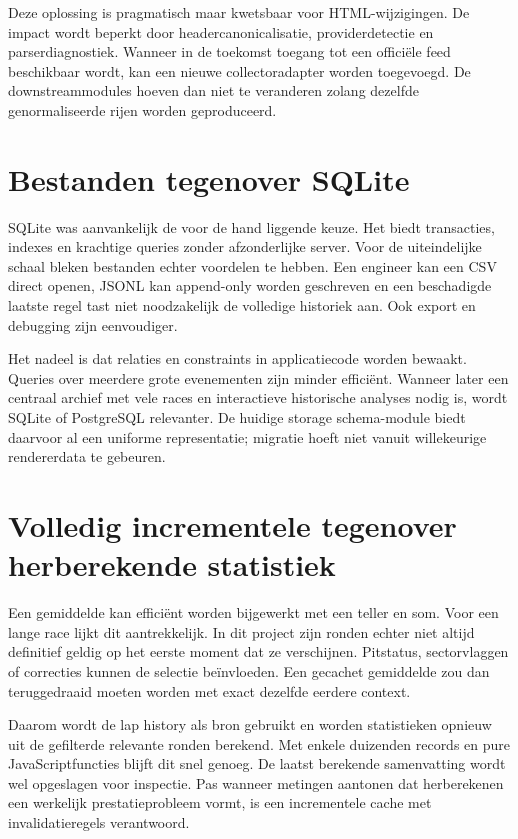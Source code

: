 Deze oplossing is pragmatisch maar kwetsbaar voor HTML-wijzigingen. De impact wordt beperkt door
headercanonicalisatie, providerdetectie en parserdiagnostiek. Wanneer in de toekomst toegang tot een
officiële feed beschikbaar wordt, kan een nieuwe collectoradapter worden toegevoegd. De
downstreammodules hoeven dan niet te veranderen zolang dezelfde genormaliseerde rijen worden
geproduceerd.

\section{Bestanden tegenover SQLite}
SQLite was aanvankelijk de voor de hand liggende keuze. Het biedt transacties, indexes en krachtige
queries zonder afzonderlijke server. Voor de uiteindelijke schaal bleken bestanden echter voordelen
te hebben. Een engineer kan een CSV direct openen, JSONL kan append-only worden geschreven en een
beschadigde laatste regel tast niet noodzakelijk de volledige historiek aan. Ook export en debugging
zijn eenvoudiger.

Het nadeel is dat relaties en constraints in applicatiecode worden bewaakt. Queries over meerdere
grote evenementen zijn minder efficiënt. Wanneer later een centraal archief met vele races en
interactieve historische analyses nodig is, wordt SQLite of PostgreSQL relevanter. De huidige
storage schema-module biedt daarvoor al een uniforme representatie; migratie hoeft niet vanuit
willekeurige rendererdata te gebeuren.

\section{Volledig incrementele tegenover herberekende statistiek}
Een gemiddelde kan efficiënt worden bijgewerkt met een teller en som. Voor een lange race lijkt dit
aantrekkelijk. In dit project zijn ronden echter niet altijd definitief geldig op het eerste moment
dat ze verschijnen. Pitstatus, sectorvlaggen of correcties kunnen de selectie beïnvloeden. Een
gecachet gemiddelde zou dan teruggedraaid moeten worden met exact dezelfde eerdere context.

Daarom wordt de lap history als bron gebruikt en worden statistieken opnieuw uit de gefilterde
relevante ronden berekend. Met enkele duizenden records en pure JavaScriptfuncties blijft dit snel
genoeg. De laatst berekende samenvatting wordt wel opgeslagen voor inspectie. Pas wanneer metingen
aantonen dat herberekenen een werkelijk prestatieprobleem vormt, is een incrementele cache met
invalidatieregels verantwoord.

